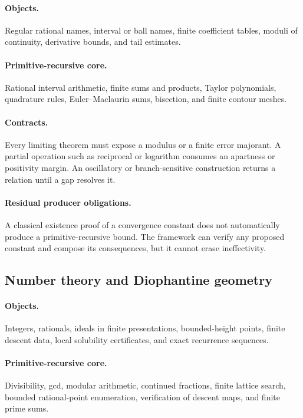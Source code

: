 \paragraph{Objects.}
Regular rational names, interval or ball names, finite coefficient tables,
moduli of continuity, derivative bounds, and tail estimates.

\paragraph{Primitive-recursive core.}
Rational interval arithmetic, finite sums and products, Taylor polynomials,
quadrature rules, Euler--Maclaurin sums, bisection, and finite contour meshes.

\paragraph{Contracts.}
Every limiting theorem must expose a modulus or a finite error majorant.  A
partial operation such as reciprocal or logarithm consumes an apartness or
positivity margin.  An oscillatory or branch-sensitive construction returns a
relation until a gap resolves it.

\paragraph{Residual producer obligations.}
A classical existence proof of a convergence constant does not automatically
produce a primitive-recursive bound.  The framework can verify any proposed
constant and compose its consequences, but it cannot erase ineffectivity.

\subsection{Number theory and Diophantine geometry}

\paragraph{Objects.}
Integers, rationals, ideals in finite presentations, bounded-height points,
finite descent data, local solubility certificates, and exact recurrence
sequences.

\paragraph{Primitive-recursive core.}
Divisibility, gcd, modular arithmetic, continued fractions, finite lattice
search, bounded rational-point enumeration, verification of descent maps, and
finite prime sums.

